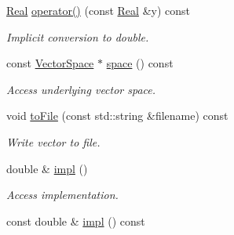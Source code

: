 \begin{DoxyCompactItemize}
\item 
\hyperlink{classSpacy_1_1Real}{Real} \hyperlink{classSpacy_1_1Real_acc5c6c1265a8f41e5de825a0e5aa5b2a_acc5c6c1265a8f41e5de825a0e5aa5b2a}{operator()} (const \hyperlink{classSpacy_1_1Real}{Real} \&y) const 
\begin{DoxyCompactList}\small\item\em Implicit conversion to double. \end{DoxyCompactList}\item 
const \hyperlink{classSpacy_1_1VectorSpace}{Vector\+Space} $\ast$ \hyperlink{classSpacy_1_1VectorBase_a95e87ce98f5a7646055d4e87e6024044_a95e87ce98f5a7646055d4e87e6024044}{space} () const 
\begin{DoxyCompactList}\small\item\em Access underlying vector space. \end{DoxyCompactList}\item 
void \hyperlink{classSpacy_1_1VectorBase_afb1386a51c713d85ea2fc7a2cb41d04e_afb1386a51c713d85ea2fc7a2cb41d04e}{to\+File} (const std\+::string \&filename) const 
\begin{DoxyCompactList}\small\item\em Write vector to file. \end{DoxyCompactList}\item 
\hypertarget{classSpacy_1_1Mixin_1_1Impl_a5e61399bae41338a87e701b24b13f52a}{}double \& \hyperlink{classSpacy_1_1Mixin_1_1Impl_a5e61399bae41338a87e701b24b13f52a}{impl} ()\label{classSpacy_1_1Mixin_1_1Impl_a5e61399bae41338a87e701b24b13f52a}

\begin{DoxyCompactList}\small\item\em Access implementation. \end{DoxyCompactList}\item 
\hypertarget{classSpacy_1_1Mixin_1_1Impl_a5107a82d550ed5f6564ffe9155c48fae}{}const double \& \hyperlink{classSpacy_1_1Mixin_1_1Impl_a5107a82d550ed5f6564ffe9155c48fae}{impl} () const\label{classSpacy_1_1Mixin_1_1Impl_a5107a82d550ed5f6564ffe9155c48fae}


\end{DoxyCompactItemize}
